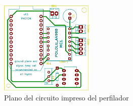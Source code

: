 \documentclass[12pt,a4paper]{article}
\begin{document}
\begin{figure}[H]
  \centering
  \includegraphics[width=0.4\textwidth]{fig/circuito_pcb}
  \caption{Plano del circuito impreso del perfilador}
  \label{fig:circuito_pcb}
\end{figure}
\end{document}
